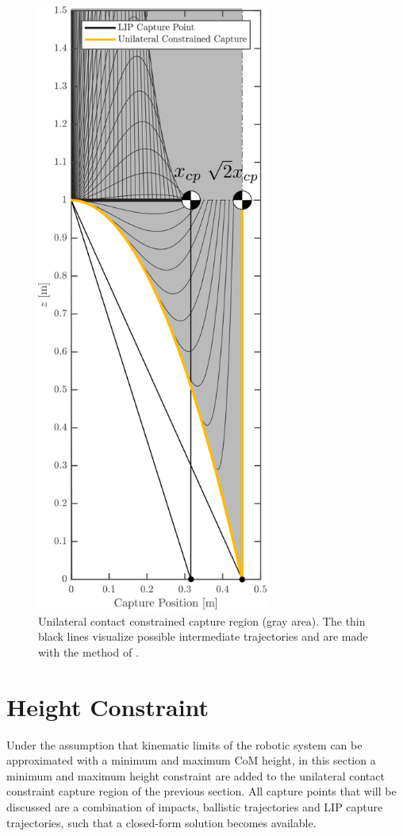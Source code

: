 \begin{figure}
\centering
\includegraphics[width=3.0in]{STYLESTUFF/CPvsBalistic2.png}
\caption{Unilateral contact constrained capture region (gray area). The thin black lines visualize possible intermediate trajectories and are made with the method of \cite{koolen2016balance}.}
\label{fig:cpbal}
\end{figure}

\section{Height Constraint}
Under the assumption that kinematic limits of the robotic system can be approximated with a minimum and maximum \ac{CoM} height, in this section a minimum and maximum height constraint are added to the unilateral contact constraint capture region of the previous section. All capture points that will be discussed are a combination of impacts, ballistic trajectories and \ac{LIP} capture trajectories, such that a closed-form solution becomes available. 
